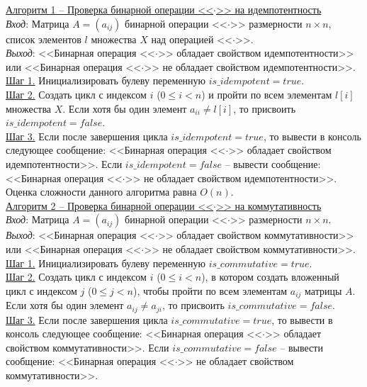 \documentclass[bachelor, och, labwork]{shiza}
\begin{document}
        \underline{Алгоритм 1 -- Проверка бинарной операции <<$\cdot$>> на идемпотентность}\\
            \textit{Вход}: Матрица $A = (a_{ij})$ бинарной операции <<$\cdot$>> размерности $n \times n$, список элементов $l$ множества $X$ над
            операцией <<$\cdot$>>.\\
            \textit{Выход}: <<Бинарная операция <<$\cdot$>> обладает свойством идемпотентности>> или 
            <<Бинарная операция <<$\cdot$>> не обладает свойством идемпотентности>>.\\
            \underline{Шаг 1.} Инициализировать булеву переменную $is\_idempotent = true$.\\
            \underline{Шаг 2.} Создать цикл с индексом $i$ ($0 \leq i < n$) и пройти по всем элементам $l[i]$ множества $X$. Если хотя бы один 
            элемент $a_{ii} \neq l[i]$, то присвоить $is\_idempotent = false$.\\            
            \underline{Шаг 3.} Если после завершения цикла $is\_idempotent = true$, то вывести в консоль следующее сообщение:
            <<Бинарная операция <<$\cdot$>> обладает свойством идемпотентности>>. Если $is\_idempotent = false$ -- вывести сообщение:
            <<Бинарная операция <<$\cdot$>> не обладает свойством идемпотентности>>.\\
            
            Оценка сложности данного алгоритма равна $O(n)$.\\

        \underline{Алгоритм 2 -- Проверка бинарной операции <<$\cdot$>> на коммутативность}\\
            \textit{Вход}: Матрица $A = (a_{ij})$ бинарной операции <<$\cdot$>> размерности $n \times n$.\\
            \textit{Выход}: <<Бинарная операция <<$\cdot$>> обладает свойством коммутативности>> или 
            <<Бинарная операция <<$\cdot$>> не обладает свойством коммутативности>>.\\
            \underline{Шаг 1.} Инициализировать булеву переменную $is\_commutative = true$.\\
            \underline{Шаг 2.} Создать цикл с индексом $i$ ($0 \leq i < n$), в котором создать вложенный цикл с индексом $j$ ($0 \leq j < n$),
            чтобы пройти по всем элементам $a_{ij}$ матрицы $A$. Если хотя бы один элемент $a_{ij} \neq a_{ji}$, то присвоить $is\_commutative = false$.\\            
            \underline{Шаг 3.} Если после завершения цикла $is\_commutative = true$, то вывести в консоль следующее сообщение:
            <<Бинарная операция <<$\cdot$>> обладает свойством коммутативности>>. Если $is\_commutative = false$ -- вывести сообщение:
            <<Бинарная операция <<$\cdot$>> не обладает свойством коммутативности>>.\\
            
\end{document}

